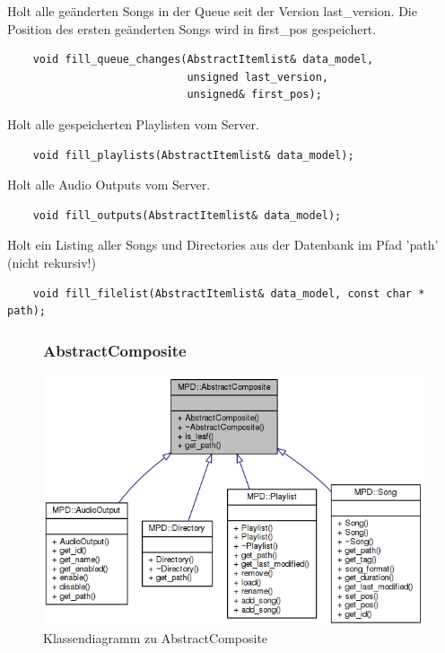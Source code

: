 Holt alle geänderten Songs in der Queue seit der Version last\_version. Die Position des ersten geänderten Songs wird in first\_pos gespeichert. 
\begin{verbatim}
    void fill_queue_changes(AbstractItemlist& data_model,
                            unsigned last_version,
                            unsigned& first_pos);
\end{verbatim}

Holt alle gespeicherten Playlisten vom Server.
\begin{verbatim}              
    void fill_playlists(AbstractItemlist& data_model);
\end{verbatim}

Holt alle Audio Outputs vom Server.
\begin{verbatim}
    void fill_outputs(AbstractItemlist& data_model);
\end{verbatim}

Holt ein Listing aller Songs und Directories aus der Datenbank im Pfad 'path' (nicht rekursiv!)              
\begin{verbatim}
    void fill_filelist(AbstractItemlist& data_model, const char * path);
\end{verbatim}


\newpage
\begin{figure}[htb!]
\subsubsection{AbstractComposite}
	\centering
        \includegraphics[width=\textwidth]{AbstractComposite.png}
	\caption{Klassendiagramm zu AbstractComposite}
	\label{c_abstract_composite}
\end{figure}

